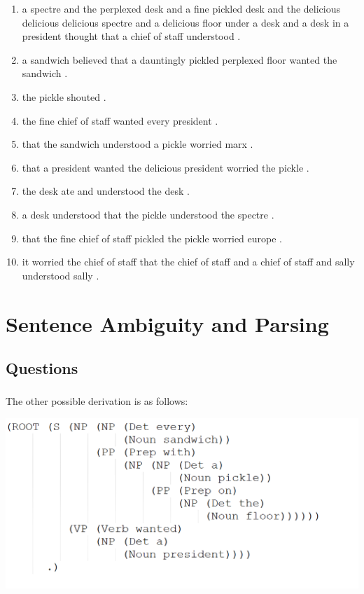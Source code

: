 \documentclass[11pt]{article}
\begin{document}
\begin{enumerate}[label=(\arabic*)]
      \item a spectre and the perplexed desk and a fine pickled desk and the delicious delicious delicious spectre and a delicious floor under a desk and a desk in a president thought that a chief of staff understood .
      \item a sandwich believed that a dauntingly pickled perplexed floor wanted the sandwich .
      \item the pickle shouted .
      \item the fine chief of staff wanted every president .
      \item that the sandwich understood a pickle worried marx .
      \item that a president wanted the delicious president worried the pickle .
      \item the desk ate and understood the desk .
      \item a desk understood that the pickle understood the spectre .
      \item that the fine chief of staff pickled the pickle worried europe .
      \item it worried the chief of staff that the chief of staff and a chief of staff and sally understood sally .
\end{enumerate}

\section{Sentence Ambiguity and Parsing}

\subsection{Questions}

\subsubsection{}

\noindent The other possible derivation is as follows:

\includegraphics{tree5.png}
\end{document}
